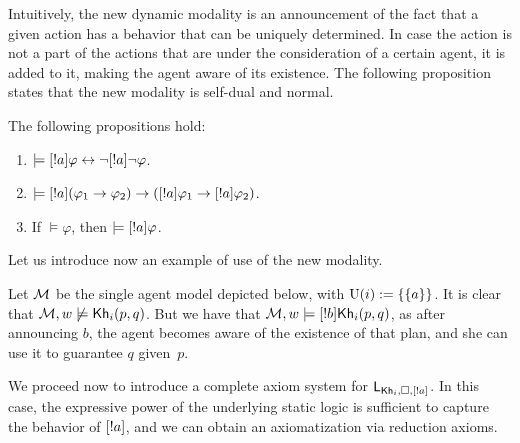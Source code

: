\medskip

Intuitively, the new dynamic modality is an announcement of the fact that a given action has a behavior that can be uniquely determined. In case the action is not a part of the actions that are under the consideration of a certain agent, it is added to it, making the agent aware of its existence. 
The following proposition states that the new modality is self-dual and normal.

\medskip

\begin{proposition} The following propositions hold:
\begin{enumerate}
\item $\models [!a]\varphi \leftrightarrow \neg[!a]\neg\varphi$. 
\item $\models [!a](\varphi_1 \rightarrow \varphi_2) \rightarrow ([!a]\varphi_1 \rightarrow [!a]\varphi_2)$.
\item If $\models \varphi$, then $\models [!a]\varphi$.
\end{enumerate}
\end{proposition}

\medskip

Let us introduce now an example of use of the new modality.

\medskip

\begin{example}
Let $\mathcal{M}$ be the single agent model depicted below, with $\operatorname{U}(i):=\{ \{ a \} \}$. It is clear that $\mathcal{M},w\not\models{\sf Kh}_i(p,q)$. But we have that $\mathcal{M},w\models[!b]{\sf Kh}_i(p,q)$, as after announcing $b$, the agent becomes aware of the existence of that plan, and she can use it to guarantee $q$ given~$p$. 
\begin{center}
\end{center} 
\end{example}

We proceed now to introduce a complete axiom system for $\mathsf{L}_{{\sf Kh}_i,\square,[!a]}$. In this case, the expressive power of the underlying static logic is sufficient to capture the behavior of $[!a]$, and we can obtain an axiomatization via reduction axioms.

